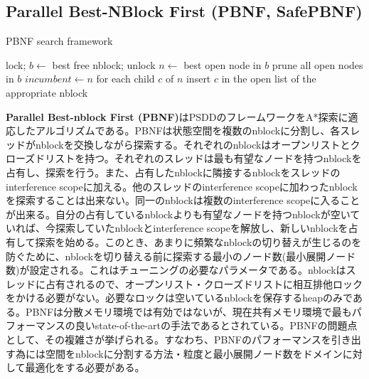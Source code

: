 \documentclass[uplatex]{jsarticle}
\begin{document}
\subsection{Parallel Best-NBlock First (PBNF, SafePBNF)}

\begin{algorithm}                      
\caption{PBNF search framework}         
\label{alg:pbnf}                          
\begin{algorithmic}                  
	\STATE lock; $b \leftarrow$ best free nblock; unlock
		\STATE $n \leftarrow$ best open node in $b$
			\STATE prune all open nodes in $b$
			\STATE $incumbent \leftarrow n$
		\ELSE 
			\STATE for each child $c$ of $n$
			\STATE insert $c$ in the open list of the appropriate nblock
		\ENDIF
\ENDWHILE
\ENDWHILE
\end{algorithmic}
\end{algorithm}

\textbf{Parallel Best-nblock First (PBNF)}はPSDDのフレームワークをA*探索に適応したアルゴリズムである。PBNFは状態空間を複数のnblockに分割し、各スレッドがnblockを交換しながら探索する\cite{Burns2010}。それぞれのnblockはオープンリストとクローズドリストを持つ。それぞれのスレッドは最も有望なノードを持つnblockを占有し、探索を行う。また、占有したnblockに隣接するnblockをスレッドのinterference scopeに加える。他のスレッドのinterference scopeに加わったnblockを探索することは出来ない。同一のnblockは複数のinterference scopeに入ることが出来る。自分の占有しているnblockよりも有望なノードを持つnblockが空いていれば、今探索していたnblockとinterference scopeを解放し、新しいnblockを占有して探索を始める。このとき、あまりに頻繁なnblockの切り替えが生じるのを防ぐために、nblockを切り替える前に探索する最小のノード数(最小展開ノード数)が設定される。これはチューニングの必要なパラメータである。nblockはスレッドに占有されるので、オープンリスト・クローズドリストに相互排他ロックをかける必要がない。必要なロックは空いているnblockを保存するheapのみである。PBNFは分散メモリ環境では有効ではないが、現在共有メモリ環境で最もパフォーマンスの良いstate-of-the-artの手法であるとされている。PBNFの問題点として、その複雑さが挙げられる。すなわち、PBNFのパフォーマンスを引き出す為には空間をnblockに分割する方法・粒度と最小展開ノード数をドメインに対して最適化をする必要がある。
\end{document}

